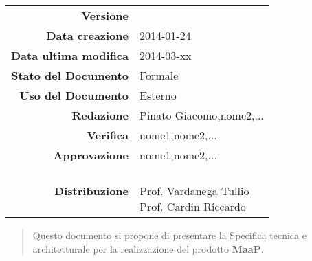 


\newcommand{\Versione}{\versioneSpecificaTecnica{}}	  %
\newcommand{\Data}{2014-01-24}				           %
\newcommand{\DataUltimaModifica}{2014-03-xx}
\newcommand{\TipoDocumento}{Specifica Tecnica}	       %



\begin{center}
\begin{tabular}{r|l}
\textbf{Versione} & \Versione{} \\
\textbf{Data creazione} & \Data{} \\
\textbf{Data ultima modifica} & \DataUltimaModifica{} \\
\textbf{Stato del Documento} & Formale \\		          %
\textbf{Uso del Documento} & Esterno \\			          %
\textbf{Redazione} &  Pinato Giacomo,nome2,...\\		        %
\textbf{Verifica} & nome1,nome2,...\\			        %
\textbf{Approvazione} & nome1,nome2,...\\				 %
\textbf{Distribuzione} & \parbox[t]{4cm}{\NomeGruppo{}\\Prof. Vardanega Tullio\\Prof. Cardin Riccardo\\ \Prop{} }\\
\end{tabular}
\end{center}

\vspace{0.05in}

\begin{abstract}
\begin{center}
Questo documento si propone di presentare la Specifica tecnica e architetturale per la realizzazione del prodotto \textbf{MaaP}.
\end{center}
\end{abstract}

